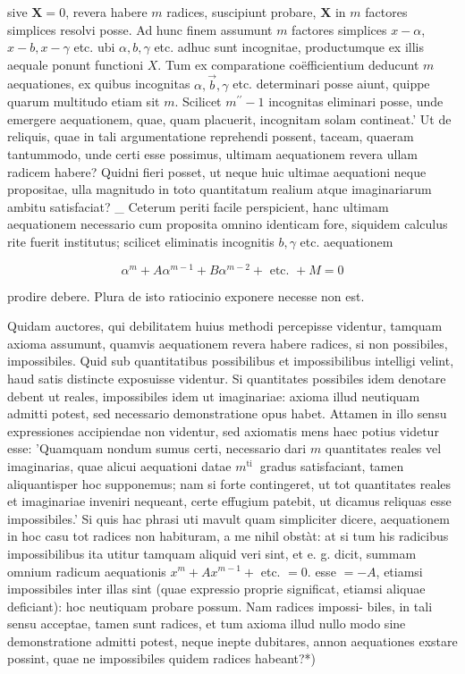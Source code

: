 \documentclass[10pt]{article}
\begin{document}
sive \(\boldsymbol{X}=0\), revera habere \(m\) radices, suscipiunt probare, \(\boldsymbol{X}\) in \(m\) factores simplices resolvi posse. Ad hunc finem assumunt \(m\) factores simplices \(x-\alpha\), \(x-b, x-\gamma\) etc. ubi \(\alpha, b, \gamma\) etc. adhuc sunt incognitae, productumque ex illis aequale ponunt functioni \(X\). Tum ex comparatione coëfficientium deducunt \(m\) aequationes, ex quibus incognitas \(\alpha, \vec{b}, \gamma\) etc. determinari posse aiunt, quippe quarum multitudo etiam sit \(m\). Scilicet \(m^{\prime \prime}-1\) incognitas eliminari posse, unde emergere aequationem, quae, quam placuerit, incognitam solam contineat.' Ut de reliquis, quae in tali argumentatione reprehendi possent, taceam, quaeram tantummodo, unde certi esse possimus, ultimam aequationem revera ullam radicem habere? Quidni fieri posset, ut neque huic ultimae aequationi neque propositae, ulla magnitudo in toto quantitatum realium atque imaginariarum ambitu satisfaciat? \_ Ceterum periti facile perspicient, hanc ultimam aequationem necessario cum proposita omnino identicam fore, siquidem calculus rite fuerit institutus; scilicet eliminatis incognitis \(b, \gamma\) etc. aequationem

\[
\alpha^{m}+A \alpha^{m-1}+B \alpha^{m-2}+\text { etc. }+M=0
\]

prodire debere. Plura de isto ratiocinio exponere necesse non est.

Quidam auctores, qui debilitatem huius methodi percepisse videntur, tamquam axioma assumunt, quamvis aequationem revera habere radices, si non possibiles, impossibiles. Quid sub quantitatibus possibilibus et impossibilibus intelligi velint, haud satis distincte exposuisse videntur. Si quantitates possibiles idem denotare debent ut reales, impossibiles idem ut imaginariae: axioma illud neutiquam admitti potest, sed necessario demonstratione opus habet. Attamen in illo sensu expressiones accipiendae non videntur, sed axiomatis mens haec potius videtur esse: 'Quamquam nondum sumus certi, necessario dari \(m\) quantitates reales vel imaginarias, quae alicui aequationi datae \(m^{\text {ti }}\) gradus satisfaciant, tamen aliquantisper hoc supponemus; nam si forte contingeret, ut tot quantitates reales et imaginariae inveniri nequeant, certe effugium patebit, ut dicamus reliquas esse impossibiles.' Si quis hac phrasi uti mavult quam simpliciter dicere, aequationem in hoc casu tot radices non habituram, a me nihil obstàt: at si tum his radicibus impossibilibus ita utitur tamquam aliquid veri sint, et e. g. dicit, summam omnium radicum aequationis \(x^{m}+A x^{m-1}+\) etc. \(=0\). esse \(=-A\), etiamsi impossibiles inter illas sint (quae expressio proprie significat, etiamsi aliquae deficiant): hoc neutiquam probare possum. Nam radices impossi-
biles, in tali sensu acceptae, tamen sunt radices, et tum axioma illud nullo modo sine demonstratione admitti potest, neque inepte dubitares, annon aequationes exstare possint, quae ne impossibiles quidem radices habeant?*)
\end{document}
